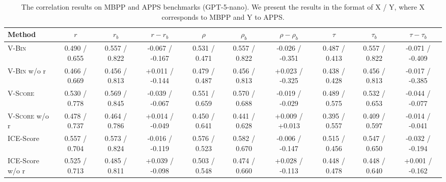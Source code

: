\begin{table}[!t]
    \centering
    \scriptsize
    \setlength{\tabcolsep}{0.8pt}
    \caption{The correlation results on MBPP and APPS benchmarks (GPT-5-nano). We present the results in the format of X / Y, where X corresponds to MBPP and Y to APPS.}
    \label{tab:mbpp-apps}
    \begin{tabular}{@{}l|ccc|ccc|ccc@{}}
        \toprule
        Method & $r$ & $r_b$ & $r-r_b$ & $\rho$ & $\rho_b$ & $\rho-\rho_b$ & $\tau$ & $\tau_b$ & $\tau-\tau_b$ \\
        \midrule
        \textsc{V-Bin}               & 0.490 / 0.655    & 0.557 / 0.822    & -0.067 / -0.167                              & 0.531 / 0.471    & 0.557 / 0.822    & -0.026 / -0.351                              & 0.487 / 0.413    & 0.557 / 0.822    & -0.071 / -0.409                              \\
        \textsc{V-Bin} w/o r         & 0.466 / 0.669    & 0.456 / 0.813    & +0.011 / -0.144                              & 0.479 / 0.487    & 0.456 / 0.813    & +0.023 / -0.325                              & 0.438 / 0.428    & 0.456 / 0.813    & -0.017 / -0.385                              \\
        \textsc{V-Score}             & 0.530 / 0.778    & 0.569 / 0.845    & -0.039 / -0.067                              & 0.551 / 0.659    & 0.570 / 0.688    & -0.019 / -0.029                              & 0.489 / 0.575    & 0.532 / 0.653    & -0.044 / -0.077                              \\
        \textsc{V-Score} w/o r       & 0.478 / 0.737    & 0.464 / 0.786    & +0.014 / -0.049                              & 0.450 / 0.641    & 0.441 / 0.628    & +0.009 / +0.013                              & 0.395 / 0.557    & 0.409 / 0.597    & -0.014 / -0.041                              \\
        \midrule
        ICE-Score                    & 0.557 / 0.704    & 0.573 / 0.824    & -0.016 / -0.119                              & 0.576 / 0.523    & 0.582 / 0.670    & -0.006 / -0.147                              & 0.515 / 0.456    & 0.547 / 0.650    & -0.032 / -0.194                              \\
        ICE-Score w/o r              & 0.525 / 0.713    & 0.485 / 0.811    & +0.039 / -0.098                              & 0.503 / 0.548    & 0.474 / 0.660    & +0.028 / -0.113                              & 0.448 / 0.478    & 0.448 / 0.640    & +0.001 / -0.162                              \\

\end{tabular}
\end{table}
